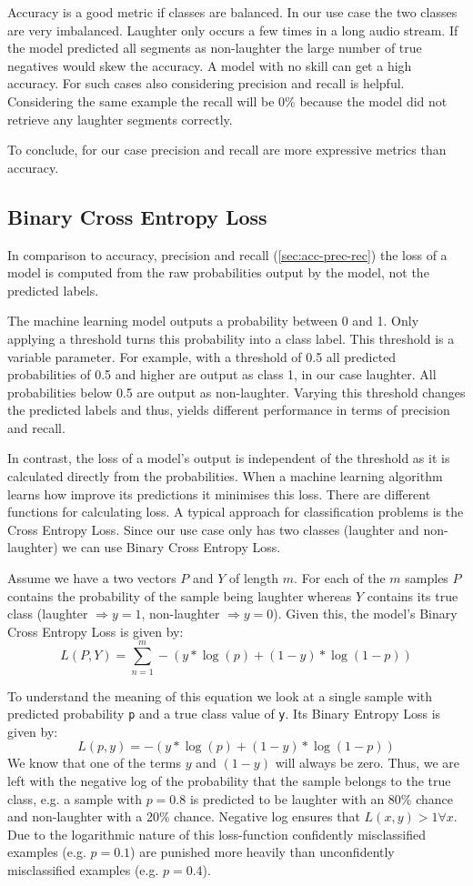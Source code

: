 \documentclass[bsc,frontabs,parskip,deptreport]{infthesis}
\begin{document}
Accuracy is a good metric if classes are balanced. In our use case the two classes are very imbalanced. Laughter only occurs a few times in a long audio stream. If the model predicted all segments as non-laughter the large number of true negatives would skew the accuracy. A model with no skill can get a high accuracy.
For such cases also considering precision and recall is helpful. Considering the same example the recall will be 0\% because the model did not retrieve any laughter segments correctly. 

To conclude, for our case precision and recall are more expressive metrics than accuracy.

\subsection{Binary Cross Entropy Loss}
In comparison to accuracy, precision and recall (\autoref{sec:acc-prec-rec}) the loss of a model is computed from the raw probabilities output by the model, not the predicted labels.

The machine learning model outputs a probability between 0 and 1. Only applying a threshold turns this probability into a class label. This threshold is a variable parameter.
For example, with a threshold of 0.5 all predicted probabilities of 0.5 and higher are output as class 1, in our case laughter. All probabilities below 0.5 are output as non-laughter. 
Varying this threshold changes the predicted labels and thus, yields different performance in terms of precision and recall. 

In contrast, the loss of a model's output is independent of the threshold as it is calculated directly from the probabilities.
When a machine learning algorithm learns how improve its predictions it minimises this loss. There are different functions for calculating loss.
A typical approach for classification problems is the Cross Entropy Loss. Since our use case only has two classes (laughter and non-laughter) we can use Binary Cross Entropy Loss. 

Assume we have a two vectors $P$ and $Y$ of length $m$. For each of the $m$ samples $P$ contains the probability of the sample being laughter whereas $Y$ contains its true class (laughter $\Rightarrow y=1$, non-laughter $ \Rightarrow y=0$).
Given this, the model's Binary Cross Entropy Loss is given by:
$$ L(P,Y) = \sum_{n=1}^{m}  -{(y*\log(p) + (1 - y)*\log(1 - p))}$$

To understand the meaning of this equation we look at a single sample with predicted probability \texttt{p} and a true class value of \texttt{y}. Its Binary Entropy Loss is given by: 
$$ L(p,y) = -{(y*\log(p) + (1 - y)*\log(1 - p))} $$
We know that one of the terms $y$ and $(1-y)$ will always be zero.
Thus, we are left with the negative log of the probability that the sample belongs to the true class, e.g. a sample with $p=0.8$ is predicted to be laughter with an 80\% chance and non-laughter with a 20\% chance. Negative log ensures that $L(x,y) > 1  \forall x $. 
Due to the logarithmic nature of this loss-function confidently misclassified examples (e.g. $p=0.1$) are punished more heavily than unconfidently misclassified examples (e.g. $p=0.4$).
\end{document}
